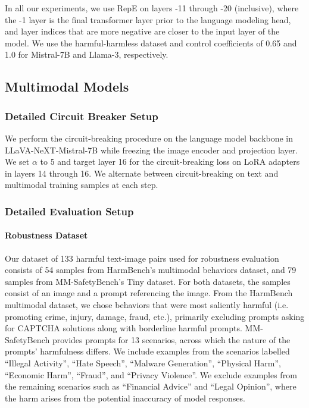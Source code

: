 In all our experiments, we use RepE on layers -11 through -20 (inclusive), where the -1 layer is the final transformer layer prior to the language modeling head, and layer indices that are more negative are closer to the input layer of the model. We use the harmful-harmless dataset \citep{zou2023representation} and control coefficients of 0.65 and 1.0 for Mistral-7B and Llama-3, respectively.

\subsection{Multimodal Models}
\label{app:multimodal}

\subsubsection{Detailed Circuit Breaker Setup} \label{mm-details}
We perform the circuit-breaking procedure on the language model backbone in LLaVA-NeXT-Mistral-7B \citep{liu2024llavanext} while freezing the image encoder and projection layer. We set $\alpha$ to 5 and target layer 16 for the circuit-breaking loss on LoRA adapters in layers 14 through 16. We alternate between circuit-breaking on text and multimodal training samples at each step.

\subsubsection{Detailed Evaluation Setup}
\paragraph{Robustness Dataset}
Our dataset of 133 harmful text-image pairs used for robustness evaluation consists of 54 samples from HarmBench's multimodal behaviors dataset, and 79 samples from MM-SafetyBench's Tiny dataset. For both datasets, the samples consist of an image and a prompt referencing the image. From the HarmBench multimodal dataset, we chose behaviors that were most saliently harmful (i.e. promoting crime, injury, damage, fraud, etc.), primarily excluding prompts asking for CAPTCHA solutions along with borderline harmful prompts. MM-SafetyBench provides prompts for 13 scenarios, across which the nature of the prompts' harmfulness differs. We include examples from the scenarios labelled ``Illegal Activity'', ``Hate Speech'', ``Malware Generation'', ``Physical Harm'', ``Economic Harm'', ``Fraud'', and ``Privacy Violence''. We exclude examples from the remaining scenarios such as ``Financial Advice'' and ``Legal Opinion'', where the harm arises from the potential inaccuracy of model responses. 

